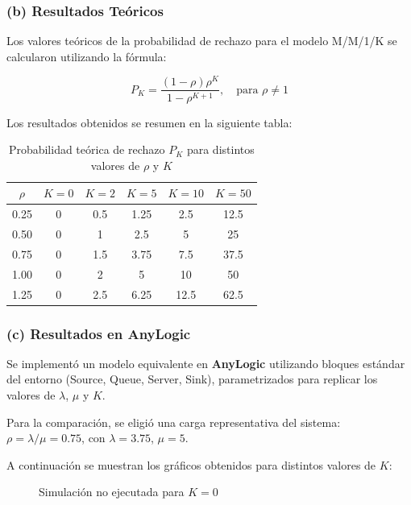 \documentclass[12pt]{article}
\begin{document}
\subsubsection*{(b) Resultados Teóricos}

Los valores teóricos de la probabilidad de rechazo para el modelo M/M/1/K se calcularon utilizando la fórmula:

\[
P_K = \frac{(1 - \rho) \rho^K}{1 - \rho^{K+1}}, \quad \text{para } \rho \neq 1
\]

Los resultados obtenidos se resumen en la siguiente tabla:

\begin{table}[H]
\centering
\begin{tabular}{|c|c|c|c|c|c|}
\hline
\( \rho \) & \( K=0 \) & \( K=2 \) & \( K=5 \) & \( K=10 \) & \( K=50 \) \\
\hline
0.25 & 0 & 0.5 & 1.25 & 2.5 & 12.5 \\
0.50 & 0 & 1 & 2.5 & 5 & 25 \\
0.75 & 0 & 1.5 & 3.75 & 7.5 & 37.5 \\
1.00 & 0 & 2 & 5 & 10 & 50 \\
1.25 & 0 & 2.5 & 6.25 & 12.5 & 62.5 \\
\hline
\end{tabular}
\caption{Probabilidad teórica de rechazo \( P_K \) para distintos valores de \( \rho \) y \( K \)}
\end{table}

\subsubsection*{(c) Resultados en AnyLogic}

Se implementó un modelo equivalente en \textbf{AnyLogic} utilizando bloques estándar del entorno (Source, Queue, Server, Sink), parametrizados para replicar los valores de \( \lambda \), \( \mu \) y \( K \).

Para la comparación, se eligió una carga representativa del sistema: \( \rho = \lambda / \mu = 0.75 \), con \( \lambda = 3.75 \), \( \mu = 5 \).

A continuación se muestran los gráficos obtenidos para distintos valores de \( K \):

\begin{figure}[H]
    \centering
    \caption{Simulación no ejecutada para \( K = 0 \)}
\end{figure}
\end{document}

